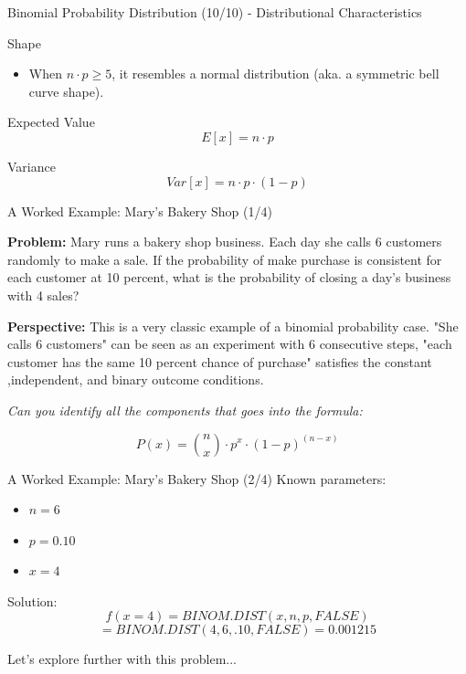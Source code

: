 \documentclass{beamer}
\begin{document}
\begin{frame}{Binomial Probability Distribution (10/10) - Distributional Characteristics}

Shape
\begin{itemize}
\item When $n \cdot p \geq 5$, it resembles a normal distribution (aka. a symmetric bell curve shape).
\end{itemize}

\vspace{0.3 cm}

Expected Value
$$E\left[x \right]  = n \cdot p$$

\vspace{0.3 cm}

Variance
$$Var\left[  x \right] = n \cdot p \cdot (1-p)$$

\end{frame}


\begin{frame}{A Worked Example: Mary's Bakery Shop (1/4)}

\textbf{Problem: }
Mary runs a bakery shop business. Each day she calls 6 customers randomly to make a sale. If the probability of make purchase is consistent for each customer at 10 percent, what is the probability of closing a day's business with 4 sales? 

\vspace{0.3 cm}

\textbf{Perspective: }
This is a very classic example of a binomial probability case. "She calls 6 customers" can be seen as an experiment with 6 consecutive steps, "each customer has the same 10 percent chance of purchase" satisfies the constant ,independent, and binary outcome conditions. 

\vspace{0.3 cm}
\textit{Can you identify all the components that goes into the formula: }

$$ P(x) = {n \choose x}  \cdot p^x \cdot (1-p)^{(n-x)} $$



\end{frame}



\begin{frame}{A Worked Example: Mary's Bakery Shop (2/4)}
Known parameters: 
\begin{itemize}
\item $n = 6$
\item $p = 0.10$
\item $x = 4$
\end{itemize}

\vspace{0.3 cm}
Solution: 
$$f(x=4) = BINOM.DIST(x, n, p, FALSE) $$
$$= BINOM.DIST(4, 6, .10, FALSE) = 0.001215$$

\vspace{0.3 cm}
Let's explore further with this problem...

\end{frame}
\end{document}
